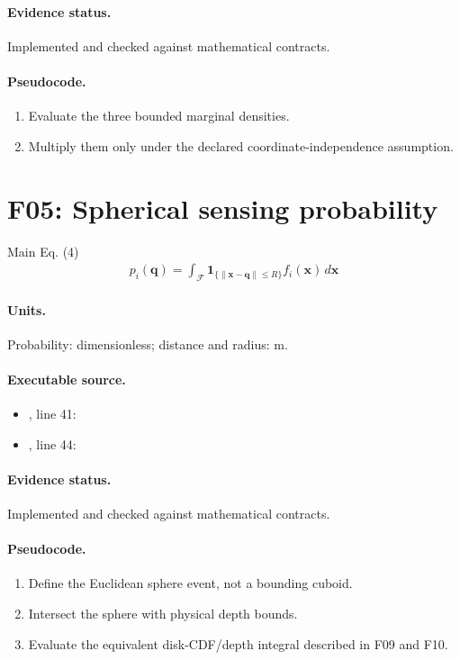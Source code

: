 \documentclass[10pt]{article}
\begin{document}
\paragraph{Evidence status.} Implemented and checked against mathematical contracts.
\paragraph{Pseudocode.}
\begin{enumerate}[leftmargin=*]
\item Evaluate the three bounded marginal densities.
\item Multiply them only under the declared coordinate-independence assumption.
\end{enumerate}
\newpage
\section*{F05: Spherical sensing probability}
Main Eq. (4)
\begin{gather*}p_i(\mathbf q)=\int_{\mathcal F}\mathbf1_{\{\|\mathbf x-\mathbf q\|\le R\}}f_i(\mathbf x)\,d\mathbf x\end{gather*}
\paragraph{Units.} Probability: dimensionless; distance and radius: m.
\paragraph{Executable source.}
\begin{itemize}[leftmargin=*]
\item {}, line 41: 
\item {}, line 44: 
\end{itemize}
\paragraph{Evidence status.} Implemented and checked against mathematical contracts.
\paragraph{Pseudocode.}
\begin{enumerate}[leftmargin=*]
\item Define the Euclidean sphere event, not a bounding cuboid.
\item Intersect the sphere with physical depth bounds.
\item Evaluate the equivalent disk-CDF/depth integral described in F09 and F10.
\end{enumerate}
\newpage
\end{document}
